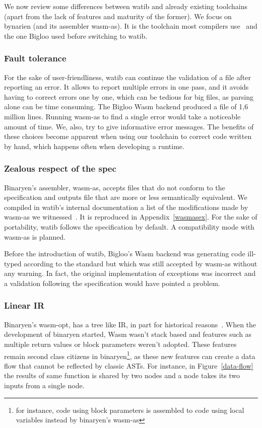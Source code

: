 \documentclass[a4paper,11pt]{article}
\begin{document}
We now review some differences between \textsf{watib} and already existing
toolchains (apart from the lack of features and maturity of the former). We
focus on bynarien (and its assembler \textsf{wasm-as}). It is the toolchain most
compilers use~\cite{Binaryen} and the one Bigloo used before switching to
\textsf{watib}.
\subsubsection{Fault tolerance}
For the sake of user-friendliness, \textsf{watib} can continue the validation of
a file after reporting an error. It allows to report multiple errors in one
pass, and it avoids having to correct errors one by one, which can be tedious
for big files, as parsing alone can be time consuming. The Bigloo Wasm backend
produced a file of 1,6 million lines. Running \textsf{wasm-as} to find a single
error would take a noticeable amount of time. We, also, try to give informative
error messages. The benefits of these choices become apparent when using our
toolchain to correct code written by hand, which happens often when developing a
runtime.

\subsubsection{{Zealous\protect\footnotemark} respect of the spec}
Binaryen's assembler, \textsf{wasm-as}, accepts files that do not conform to the
specification and outputs file that are more or less semantically equivalent. We
compiled in \textsf{watib}'s internal documentation a list of the modifications
made by \textsf{wasm-as} we witnessed~\cite{WasmAsExtension}. It is reproduced
in Appendix~\ref{wasmasex}. For the sake of portability, \textsf{watib} follows
the specification by default. A compatibility mode with \textsf{wasm-as} is
planned.

Before the introduction of \textsf{watib}, Bigloo's Wasm backend was generating
code ill-typed according to the standard but which was still accepted by
\textsf{wasm-as} without any warning. In fact, the original implementation of
exceptions was incorrect and a validation following the specification would have
pointed a problem.

\subsubsection{Linear IR}
Binaryen's \textsf{wasm-opt}, has a tree like IR, in part for historical
reasons~\cite{BinaryenIR}. When the development of binaryen started, Wasm wasn't
stack based and features such as multiple return values or block parameters
weren't adopted. These features remain second class citizens in
binaryen\footnote{for instance, code using block parameters is assembled to code
using local variables instead by binaryen's \textsf{wasm-as}}, as these new
features can create a data flow that cannot be reflected by classic ASTs. For
instance, in Figure~\ref{data-flow} the results of same function is shared by
two nodes and a node takes its two inputs from a single node.
\end{document}
